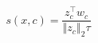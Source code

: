\begin{equation}
\label{eq:similarity}
s(x,c)=\frac{{z}_{c}^{\top }{w}_{c}}{{\left\Vert {z}_{c}\right\Vert }_{2}\tau }
\end{equation}
